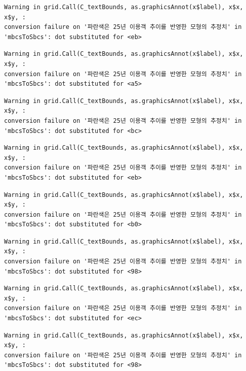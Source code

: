 \documentclass[
  letterpaper,
  DIV=11,
  numbers=noendperiod]{scrreprt}
\begin{document}
\begin{verbatim}
Warning in grid.Call(C_textBounds, as.graphicsAnnot(x$label), x$x, x$y, :
conversion failure on '파란색은 25년 이용객 추이를 반영한 모형의 추정치' in
'mbcsToSbcs': dot substituted for <eb>
\end{verbatim}

\begin{verbatim}
Warning in grid.Call(C_textBounds, as.graphicsAnnot(x$label), x$x, x$y, :
conversion failure on '파란색은 25년 이용객 추이를 반영한 모형의 추정치' in
'mbcsToSbcs': dot substituted for <a5>
\end{verbatim}

\begin{verbatim}
Warning in grid.Call(C_textBounds, as.graphicsAnnot(x$label), x$x, x$y, :
conversion failure on '파란색은 25년 이용객 추이를 반영한 모형의 추정치' in
'mbcsToSbcs': dot substituted for <bc>
\end{verbatim}

\begin{verbatim}
Warning in grid.Call(C_textBounds, as.graphicsAnnot(x$label), x$x, x$y, :
conversion failure on '파란색은 25년 이용객 추이를 반영한 모형의 추정치' in
'mbcsToSbcs': dot substituted for <eb>
\end{verbatim}

\begin{verbatim}
Warning in grid.Call(C_textBounds, as.graphicsAnnot(x$label), x$x, x$y, :
conversion failure on '파란색은 25년 이용객 추이를 반영한 모형의 추정치' in
'mbcsToSbcs': dot substituted for <b0>
\end{verbatim}

\begin{verbatim}
Warning in grid.Call(C_textBounds, as.graphicsAnnot(x$label), x$x, x$y, :
conversion failure on '파란색은 25년 이용객 추이를 반영한 모형의 추정치' in
'mbcsToSbcs': dot substituted for <98>
\end{verbatim}

\begin{verbatim}
Warning in grid.Call(C_textBounds, as.graphicsAnnot(x$label), x$x, x$y, :
conversion failure on '파란색은 25년 이용객 추이를 반영한 모형의 추정치' in
'mbcsToSbcs': dot substituted for <ec>
\end{verbatim}

\begin{verbatim}
Warning in grid.Call(C_textBounds, as.graphicsAnnot(x$label), x$x, x$y, :
conversion failure on '파란색은 25년 이용객 추이를 반영한 모형의 추정치' in
'mbcsToSbcs': dot substituted for <98>
\end{verbatim}
\end{document}
